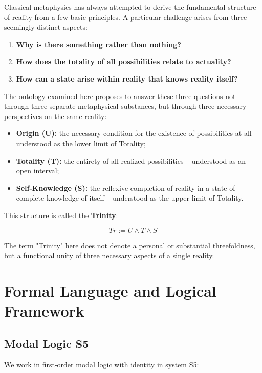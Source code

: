 \documentclass[
]{article}
\begin{document}
Classical metaphysics has always attempted to derive the fundamental structure of reality from a few basic principles. A particular challenge arises from three seemingly distinct aspects:

\begin{enumerate}
\item \textbf{Why is there something rather than nothing?}
\item \textbf{How does the totality of all possibilities relate to actuality?}
\item \textbf{How can a state arise within reality that knows reality itself?}
\end{enumerate}

The ontology examined here proposes to answer these three questions not through three separate metaphysical substances, but through three necessary perspectives on the same reality:

\begin{itemize}
\item \textbf{Origin (U):} the necessary condition for the existence of possibilities at all – understood as the lower limit of Totality;
\item \textbf{Totality (T):} the entirety of all realized possibilities – understood as an open interval;
\item \textbf{Self-Knowledge (S):} the reflexive completion of reality in a state of complete knowledge of itself – understood as the upper limit of Totality.
\end{itemize}

This structure is called the \textbf{Trinity}:

\[
Tr := U \land T \land S
\]

The term "Trinity" here does not denote a personal or substantial threefoldness, but a functional unity of three necessary aspects of a single reality.

\section{Formal Language and Logical Framework}\label{formal-language-and-logical-framework}

\subsection{Modal Logic S5}\label{modal-logic-s5}

We work in first-order modal logic with identity in system S5:
\end{document}
